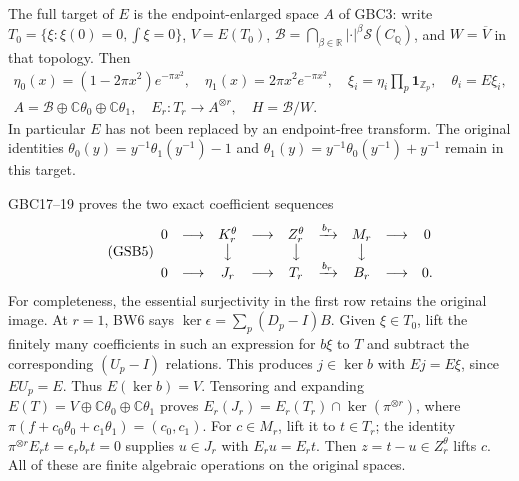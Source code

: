 The full target of $E$ is the endpoint-enlarged space $A$ of GBC3:
write $T_0=\{\xi:\xi(0)=0,\int\xi=0\}$,
$V=E(T_0)$, $\mathscr B=\bigcap_{\beta\in\mathbb R}
|\cdot|^\beta\mathcal S(C_{\mathbb Q})$, and
$W=\overline V$ in that topology. Then
\begin{equation}\tag{GSB4}
\begin{gathered}
\eta_0(x)=(1-2\pi x^2)e^{-\pi x^2},\quad
\eta_1(x)=2\pi x^2e^{-\pi x^2},\quad
\xi_i=\eta_i\prod_p\mathbf1_{\mathbb Z_p},\quad\theta_i=E\xi_i,\\
A=\mathscr B\oplus\mathbb C\theta_0\oplus\mathbb C\theta_1,
\quad E_r:T_r\longrightarrow A^{\otimes r},
\quad H=\mathscr B/W.
\end{gathered}
\end{equation}
In particular $E$ has not been replaced by an endpoint-free transform.
The original identities
$\theta_0(y)=y^{-1}\theta_1(y^{-1})-1$ and
$\theta_1(y)=y^{-1}\theta_0(y^{-1})+y^{-1}$ remain in this target.

GBC17--19 proves the two exact coefficient sequences
\begin{equation}\tag{GSB5}
\begin{array}{ccccccccc}
0&\longrightarrow&K_r^\theta&\longrightarrow&Z_r^\theta
 &\xrightarrow{b_r}&M_r&\longrightarrow&0\\
 &&\big\downarrow&&\big\downarrow&&\big\downarrow\\
0&\longrightarrow&J_r&\longrightarrow&T_r
 &\xrightarrow{b_r}&B_r&\longrightarrow&0.
\end{array}
\end{equation}
For completeness, the essential surjectivity in the first row retains
the original image. At $r=1$, BW6 says
$\ker\epsilon=\sum_p(D_p-I)B$. Given $\xi\in T_0$, lift the
finitely many coefficients in such an expression for $b\xi$ to $T$
and subtract the corresponding $(U_p-I)$ relations. This produces
$j\in\ker b$ with $Ej=E\xi$, since $EU_p=E$. Thus
$E(\ker b)=V$. Tensoring and expanding
$E(T)=V\oplus\mathbb C\theta_0\oplus\mathbb C\theta_1$ proves
$E_r(J_r)=E_r(T_r)\cap\ker(\pi^{\otimes r})$, where
$\pi(f+c_0\theta_0+c_1\theta_1)=(c_0,c_1)$.
For $c\in M_r$, lift it to $t\in T_r$; the identity
$\pi^{\otimes r}E_rt=\epsilon_rb_rt=0$ supplies $u\in J_r$
with $E_ru=E_rt$. Then $z=t-u\in Z_r^\theta$ lifts $c$.
All of these are finite algebraic operations on the original spaces.

